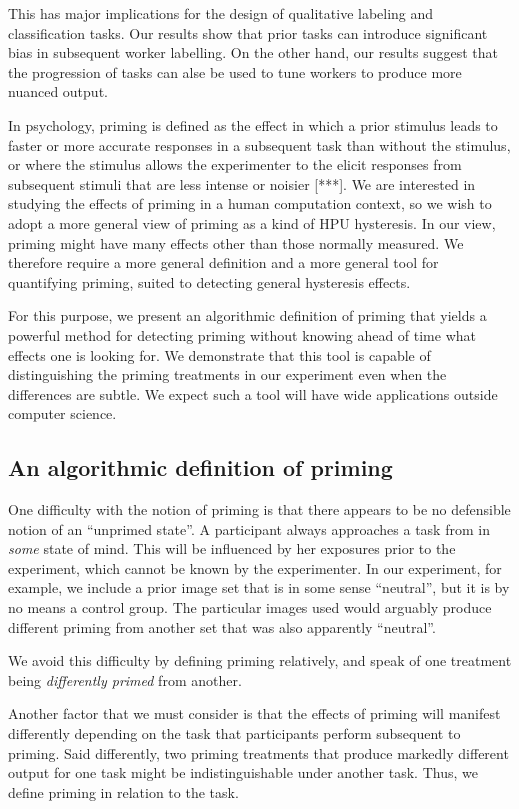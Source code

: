 \documentclass[a4paper]{report}
\begin{document}
This has major implications for the design of qualitative labeling and 
classification tasks.  Our results show that prior tasks can introduce 
significant bias in subsequent worker labelling.  On the other hand, our 
results suggest that the progression of tasks can alse be used to tune 
workers to produce more nuanced output.

In psychology, priming is defined as the effect in which a prior stimulus leads
to faster or more accurate responses in a subsequent task than without the
stimulus, or where the stimulus allows the experimenter to the elicit 
responses from subsequent stimuli that are less intense or noisier [***].
We are interested in studying the effects of priming in a human computation
context, so we wish to adopt a more general view of priming as a kind of 
HPU hysteresis.  In our view, priming might have many effects other than
those normally measured.  We therefore require a more general definition and a 
more general tool for quantifying priming, suited to detecting general 
hysteresis effects.

For this purpose, we present an algorithmic definition of priming that
yields a powerful method for detecting priming without knowing ahead of time 
what effects one is looking for.  We demonstrate that this tool is capable of 
distinguishing the priming treatments in our experiment even when the 
differences are subtle.  We expect such a tool will have wide applications 
outside computer science.

\subsection*{An algorithmic definition of priming}

One difficulty with the notion of priming is that there appears to be no 
defensible notion of an ``unprimed state''.  A participant always approaches
a task from in \textit{some} state of mind.  This will be influenced by her
exposures prior to the experiment, which cannot be known by the experimenter.  
In our experiment, for example, we include a prior image set that is in some
sense ``neutral'', but it is by no means a control group. The particular 
images used would arguably produce different priming from another set that
was also apparently ``neutral''.

We avoid this difficulty by defining priming relatively, and speak of one
treatment being \textit{differently primed} from another.

Another factor that we must consider is that the effects of priming will
manifest differently depending on the task that participants perform 
subsequent to priming.  Said differently, two priming treatments that
produce markedly different output for one task might be 
indistinguishable under another task.  Thus, we define priming
in relation to the task.
\end{document}
